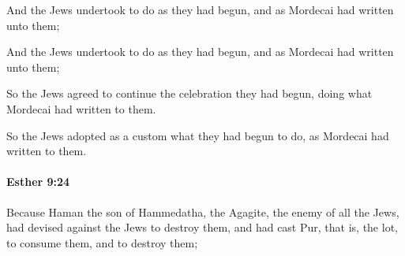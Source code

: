 			And the Jews undertook to do as they had begun, and as Mordecai had written unto them;

			\begin{versebox}
					\item[BHS] 
					\item[LXX] 
					\item[ASV] And the Jews undertook to do as they had begun, and as Mordecai had written unto them;
					\item[NIV] So the Jews agreed to continue the celebration they had begun, doing what Mordecai had written to them.
					\item[NRSV] So the Jews adopted as a custom what they had begun to do, as Mordecai had written to them.
			\end{versebox}

		\paragraph{Esther 9:24} %
			\label{ESTHER-9-24}

			Because Haman the son of Hammedatha, the Agagite, the enemy of all the Jews, had devised against the Jews to destroy them, and had cast Pur, that is, the lot, to consume them, and to destroy them;

